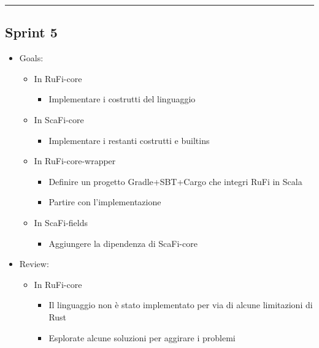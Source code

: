 \documentclass[12pt, a4paper]{article}
\begin{document}
\par\noindent\rule{\textwidth}{0.5pt}

\subsection*{Sprint 5}

\begin{itemize}
    \item Goals:
          \begin{itemize}
              \item In RuFi-core
                    \begin{itemize}
                        \item Implementare i costrutti del linguaggio
                    \end{itemize}
              \item In ScaFi-core
                    \begin{itemize}
                        \item Implementare i restanti costrutti e builtins
                    \end{itemize}
              \item In RuFi-core-wrapper
                    \begin{itemize}
                        \item Definire un progetto Gradle+SBT+Cargo che integri RuFi in Scala
                        \item Partire con l'implementazione
                    \end{itemize}
              \item In ScaFi-fields
                    \begin{itemize}
                        \item Aggiungere la dipendenza di ScaFi-core
                    \end{itemize}
          \end{itemize}
    \item Review:
          \begin{itemize}
              \item In RuFi-core
                    \begin{itemize}
                        \item Il linguaggio non è stato implementato per via di alcune limitazioni di Rust
                        \item Esplorate alcune soluzioni per aggirare i problemi
                    \end{itemize}

\end{itemize}
\end{itemize}
\end{document}
